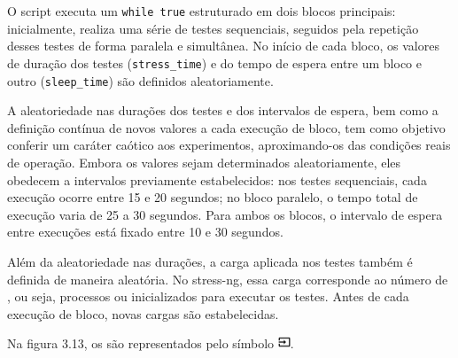 {\color{red}
O script executa um  \verb|while true| estruturado em dois blocos principais: inicialmente, realiza uma série de testes sequenciais, seguidos pela repetição desses testes de forma paralela e simultânea. No início de cada bloco, os valores de duração dos testes (\verb|stress_time|) e do tempo de espera entre um bloco e outro (\verb|sleep_time|) são definidos aleatoriamente.

A aleatoriedade nas durações dos testes e dos intervalos de espera, bem como a definição contínua de novos valores a cada execução de bloco, tem como objetivo conferir um caráter caótico aos experimentos, aproximando-os das condições reais de operação. Embora os valores sejam determinados aleatoriamente, eles obedecem a intervalos previamente estabelecidos: nos testes sequenciais, cada execução ocorre entre 15 e 20 segundos; no bloco paralelo, o tempo total de execução varia de 25 a 30 segundos. Para ambos os blocos, o intervalo de espera entre execuções está fixado entre 10 e 30 segundos.

Além da aleatoriedade nas durações, a carga aplicada nos testes também é definida de maneira aleatória. No stress-ng, essa carga corresponde ao número de , ou seja, processos ou  inicializados para executar os testes. Antes de cada execução de bloco, novas cargas são estabelecidas.

Na figura 3.13, os  são representados pelo símbolo \includegraphics[height=1em]{Imagens/chap03/input_black.png}.




}
